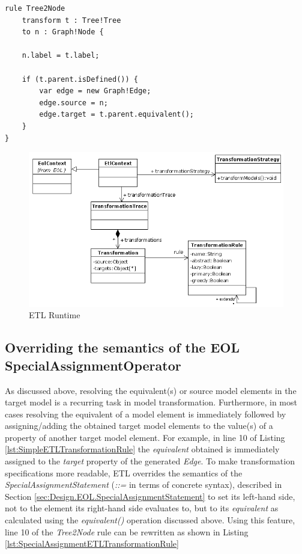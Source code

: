 \begin{lstlisting}[basicstyle=\ttfamily\footnotesize, flexiblecolumns=true, numbers=none, nolol=true, caption=Exemplar ETL Rule demonstrating the \emph{equivalent()} operation, label=lst:SimpleETLTransformationRule, numbers=left, language=ETL, tabsize=2]
rule Tree2Node
	transform t : Tree!Tree
	to n : Graph!Node { 
	
	n.label = t.label;
	
	if (t.parent.isDefined()) {
		var edge = new Graph!Edge;
		edge.source = n;
		edge.target = t.parent.equivalent();
	}
}
\end{lstlisting}

\begin{landscape}
\begin{figure}
	\centering
		\includegraphics{images/EtlRuntime.png}
	\caption{ETL Runtime}
	\label{fig:EtlRuntime}
\end{figure}
\end{landscape}

\subsection{Overriding the semantics of the EOL SpecialAssignmentOperator}
\label{sec:Design.ETL.SpecialAssignmentOperator}

As discussed above, resolving the equivalent(s) or source model elements in the target model is a recurring task in model transformation. Furthermore, in most cases resolving the equivalent of a model element is immediately followed by assigning/adding the obtained target model elements to the value(s) of a property of another target model element. For example, in line 10 of Listing \ref{lst:SimpleETLTransformationRule} the \emph{equivalent} obtained is immediately assigned to the \emph{target} property of the generated \emph{Edge}. To make transformation specifications more readable, ETL overrides the semantics of the \emph{SpecialAssignmentStatement} (\emph{::=} in terms of concrete syntax), described in Section \ref{sec:Design.EOL.SpecialAssignmentStatement} to set its left-hand side, not to the element its right-hand side evaluates to, but to its \emph{equivalent} as calculated using the \emph{equivalent()} operation discussed above. Using this feature, line 10 of the \emph{Tree2Node} rule can be rewritten as shown in Listing \ref{lst:SpecialAssignmentETLTransformationRule}

